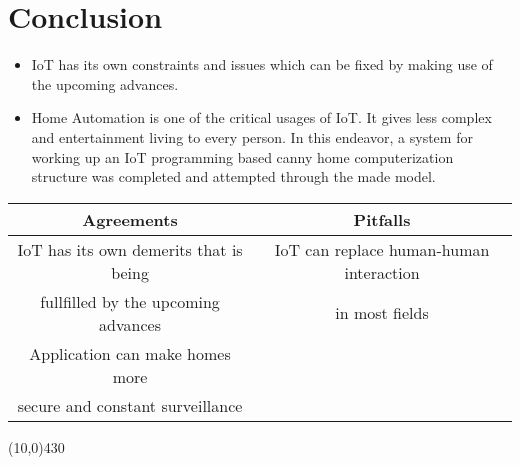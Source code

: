 \documentclass[12pt, letterpaper]{article}
\begin{document}
\hspace{1cm}

\section{Conclusion}
\begin{itemize}
\item IoT has its own constraints and issues which can be fixed by making use of the upcoming advances.
\item Home Automation is one of the critical usages of IoT. It gives less complex and entertainment living to every person. In this endeavor, a system for working up an IoT programming based canny home computerization structure was completed and attempted through the made model.
\end{itemize}

\begin{center}
\begin{tabular}{||c|c||}
\hline
Agreements & Pitfalls\\
\hline
IoT has its own demerits that is being & IoT can replace human-human interaction\\
fullfilled by the upcoming advances & in most fields\\
\hline
Application can make homes more & \\
secure and constant surveillance &\\
\hline
\end{tabular}
\end{center}


\begin{center}
\line(10,0){430}
\end{center}
\end{document}
